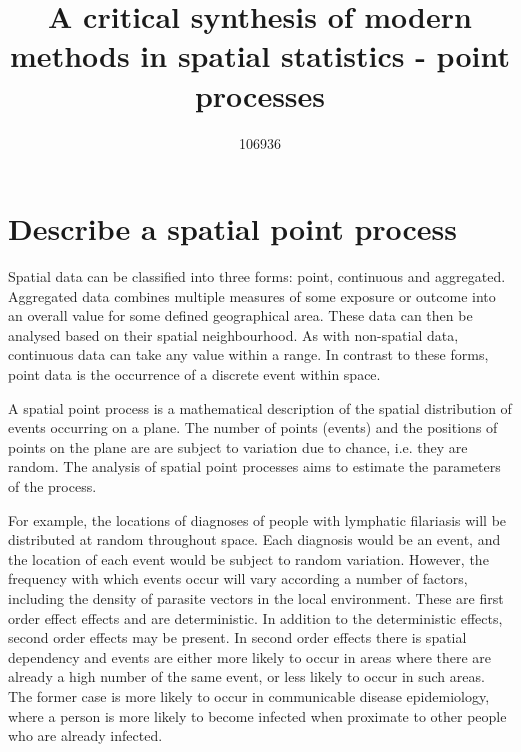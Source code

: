 \documentclass[11pt,a4paper]{article}
\author{106936}
\title{A critical synthesis of modern methods in spatial statistics - point processes}
\begin{document}
\maketitle
\section{Describe a spatial point process}
Spatial data can be classified into three forms: point, continuous and aggregated. 
Aggregated data combines multiple measures of some exposure or outcome into an overall value for some defined geographical area. 
These data can then be analysed based on their spatial neighbourhood. 
As with non-spatial data, continuous data can take any value within a range. 
In contrast to these forms, point data is the occurrence of a discrete event within space. 

A spatial point process is a mathematical description of the spatial distribution of events occurring on a plane. 
The number of points (events) and the positions of points on the plane are are subject to variation due to chance, i.e. they are random. 
The analysis of spatial point processes aims to estimate the parameters of the process. 

For example, the locations of diagnoses of people with lymphatic filariasis will be distributed at random throughout space. 
Each diagnosis would be an event, and the location of each event would be subject to random variation. 
However, the frequency with which events occur will vary according a number of factors, including the density of parasite vectors in the local environment. 
These are first order effect effects and are deterministic. 
In addition to the deterministic effects, second order effects may be present. 
In second order effects there is spatial dependency and events are either more likely to occur in areas where there are already a high number of the same event, or less likely to occur in such areas. 
The former case is more likely to occur in communicable disease epidemiology, where a person is more likely to become infected when proximate to other people who are already infected. 
\end{document}
